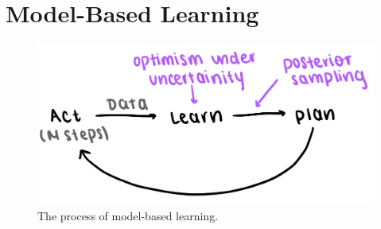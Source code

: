 \section{Model-Based Learning}
\begin{figure}[ht!]
    \centering
    \includegraphics[scale=0.2]{../ReinforcementLearning/fig/model-based.jpeg}
    \caption{The process of model-based learning.}
\end{figure}

